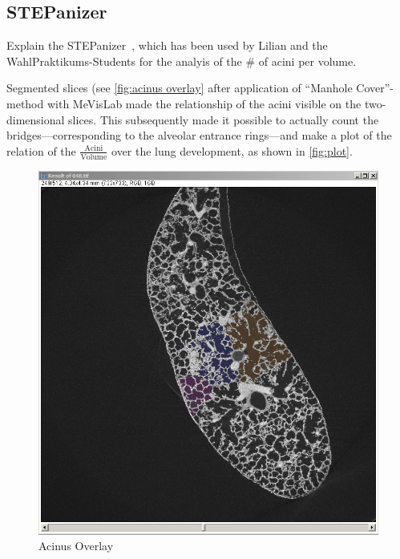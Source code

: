 \subsection{STEPanizer}
Explain the STEPanizer~\cite{Tschanz2010}, which has been used by Lilian and the WahlPraktikums-Students for the analyis of the \# of acini per volume.

Segmented slices (see \autoref{fig:acinus overlay} after application of ``Manhole Cover''-method with MeVisLab made the relationship of the acini visible on the two-dimensional slices. This subsequently made it possible to actually count the bridges---corresponding to the alveolar entrance rings---and make a plot of the relation of the $\frac{\textrm{Acini}}{\textrm{Volume}}$ over the lung development, as shown in \autoref{fig:plot}.

\renewcommand{\imsize}{0.618\linewidth}
\begin{figure}[htb]
	\centering
	\includegraphics[width=\imsize]{img/Acinus_Overlay}
	\caption{Acinus Overlay}
	\label{fig:acinus overlay}
\end{figure}

